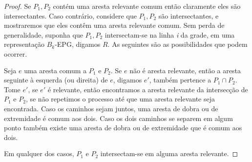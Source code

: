 \begin{proof}
Se $P_1, P_2$ contém uma aresta relevante comum então claramente eles são intersectantes. Caso contrário, considere que $P_1, P_2$ são intersectantes, e mostraremos que eles contêm uma aresta relevante comum. Sem perda de generalidade, suponha que $P_1, P_2$ intersectam-se na linha \textit{i} da grade, em uma representação   $B_k$-EPG, digamos $R$. As seguintes são as possibilidades que podem ocorrer. 

Seja $e$ uma aresta comum a $P_1$ e $P_2$. Se $e$ não é aresta relevante, então a aresta seguinte à  esquerda (ou direita) de $e$, digamos $e'$, também pertence a $P_1 \cap P_2$. Tome $e'$, se $e'$ é relevante, então encontramos a aresta relevante da intersecção de $P_1$ e $P_2$, se não repetimos o processo até que uma aresta relevante seja encontrada. Caso os caminhos sejam juntos, uma aresta de dobra ou de extremidade é comum aos dois. Caso os dois caminhos se separem em algum ponto também existe uma aresta de dobra ou de extremidade que é comum aos dois.






 
Em qualquer dos casos, $P_1$ e $P_2$ intersectam-se em alguma aresta relevante.
\end{proof}

